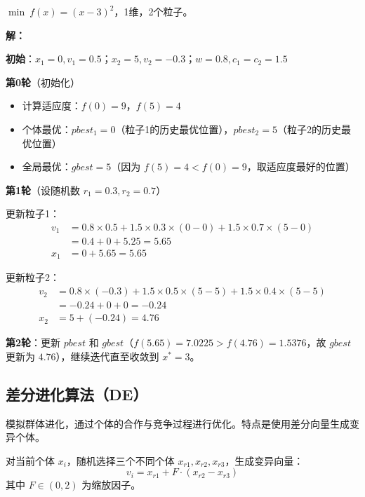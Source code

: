 \begin{example}[PSO迭代两次]\label{ex:pso}
$\min\ f(x) = (x-3)^2$，1维，2个粒子。

\textbf{解：}

\textbf{初始}：$x_1 = 0, v_1 = 0.5$；$x_2 = 5, v_2 = -0.3$；$w=0.8, c_1=c_2=1.5$

\textbf{第0轮}（初始化）
\begin{itemize}
    \item 计算适应度：$f(0)=9$，$f(5)=4$
    \item 个体最优：$pbest_1 = 0$（粒子1的历史最优位置），$pbest_2 = 5$（粒子2的历史最优位置）
    \item 全局最优：$gbest = 5$（因为 $f(5)=4 < f(0)=9$，取适应度最好的位置）
\end{itemize}

\textbf{第1轮}（设随机数 $r_1=0.3, r_2=0.7$）

更新粒子1：
\begin{align*}
v_1 &= 0.8 \times 0.5 + 1.5 \times 0.3 \times (0 - 0) + 1.5 \times 0.7 \times (5 - 0) \\
&= 0.4 + 0 + 5.25 = 5.65 \\
x_1 &= 0 + 5.65 = 5.65
\end{align*}

更新粒子2：
\begin{align*}
v_2 &= 0.8 \times (-0.3) + 1.5 \times 0.5 \times (5 - 5) + 1.5 \times 0.4 \times (5 - 5) \\
&= -0.24 + 0 + 0 = -0.24 \\
x_2 &= 5 + (-0.24) = 4.76
\end{align*}

\textbf{第2轮}：更新 $pbest$ 和 $gbest$（$f(5.65)=7.0225 > f(4.76)=1.5376$，故 $gbest$ 更新为 $4.76$），继续迭代直至收敛到 $x^* = 3$。
\end{example}

\subsection{差分进化算法（DE）}

\begin{conceptbox}[DE原理]
模拟群体进化，通过个体的合作与竞争过程进行优化。特点是使用差分向量生成变异个体。
\end{conceptbox}

\begin{definition}[DE的变异操作]
对当前个体 $x_i$，随机选择三个不同个体 $x_{r1}, x_{r2}, x_{r3}$，生成变异向量：
\[
v_i = x_{r1} + F \cdot (x_{r2} - x_{r3})
\]
其中 $F \in (0, 2)$ 为缩放因子。
\end{definition}

